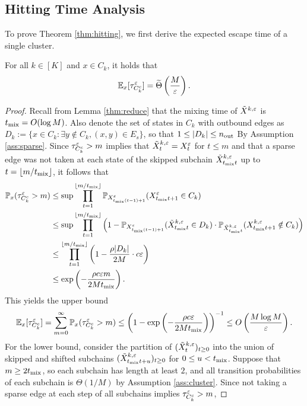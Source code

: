 \subsection{Hitting Time Analysis}

To prove Theorem \ref{thm:hitting}, we first derive the expected escape time of a single cluster.

\begin{lemma}\label{thm:escape}
For all $k\in[K]$ and $x\in C_k$, it holds that
\begin{equation*}
\mathbb{E}_{x}[\tau_{C_k^c}^\varepsilon] = \widetilde{\Theta}\left(\frac{M}{\varepsilon}\right).
\end{equation*}
\end{lemma}

\begin{proof}
Recall from Lemma \ref{thm:reduce} that the mixing time of $\tilde{X}^{k,\varepsilon}$ is $t_{\operatorname{mix}} = O(\log M)$. Also denote the set of states in $C_k$ with outbound edges as $D_k := \{x\in C_k: \exists y\notin C_k, (x,y)\in E_s\}$, so that $1\le |D_k|\le n_{\operatorname{out}}$ By Assumption \ref{ass:sparse}. Since $\tau_{C_k^c}^\varepsilon > m$ implies that $\tilde{X}_t^{k,\varepsilon}=X_t^\varepsilon$ for $t\le m$ and that a sparse edge was not taken at each state of the skipped subchain $\tilde{X}_{t_{\operatorname{mix}}t}^{k,\varepsilon}$ up to $t=\lfloor m/t_{\operatorname{mix}}\rfloor$, it follows that
\begin{align*}
\mathbb{P}_x(\tau_{C_k^c}^\varepsilon > m) &\le \sup\prod_{t=1}^{\lfloor m/t_{\operatorname{mix}}\rfloor} \mathbb{P}_{X_{t_{\operatorname{mix}}(t-1)+1}^\varepsilon} (X_{t_{\operatorname{mix}}t+1}^\varepsilon\in C_k) \\
&\le \sup\prod_{t=1}^{\lfloor m/t_{\operatorname{mix}}\rfloor} \left(1 - \mathbb{P}_{X_{t_{\operatorname{mix}}(t-1)+1}^\varepsilon}(\tilde{X}_{t_{\operatorname{mix}}t}^{k,\varepsilon}\in D_k) \cdot\mathbb{P}_{\tilde{X}_{t_{\operatorname{mix}}t}^{k,\varepsilon}}(X_{t_{\operatorname{mix}}t+1}^{k,\varepsilon}\notin C_k)\right) \\
&\le \prod_{t=1}^{\lfloor m/t_{\operatorname{mix}}\rfloor} \left(1-\frac{\rho|D_k|}{2M}\cdot c\varepsilon\right) \\
&\le \exp\left(-\frac{\rho c\varepsilon m}{2Mt_{\operatorname{mix}}}\right).
\end{align*}
This yields the upper bound
\begin{align*}
\mathbb{E}_{x}[\tau_{C_k^c}^\varepsilon] = \sum_{m=0}^\infty \mathbb{P}_x(\tau_{C_k^c}^\varepsilon > m) \le \left(1 - \exp\left(-\frac{\rho c\varepsilon}{2Mt_{\operatorname{mix}}}\right)\right)^{-1} \le O\left(\frac{M\log M}{\varepsilon}\right).
\end{align*}
For the lower bound, consider the partition of $(\tilde{X}_t^{k,\varepsilon})_{t\ge 0}$ into the union of skipped and shifted subchains $(\tilde{X}_{t_{\operatorname{mix}}t+u}^{k,\varepsilon})_{t\ge 0}$ for $0\le u<t_{\operatorname{mix}}$. Suppose that $m\ge 2t_{\operatorname{mix}}$, so each subchain has length at least $2$, and all transition probabilities of each subchain is $\Theta(1/M)$ by Assumption \ref{ass:cluster}. Since not taking a sparse edge at each step of all subchains implies $\tau_{C_k^c}^\varepsilon > m$,

\end{proof}
